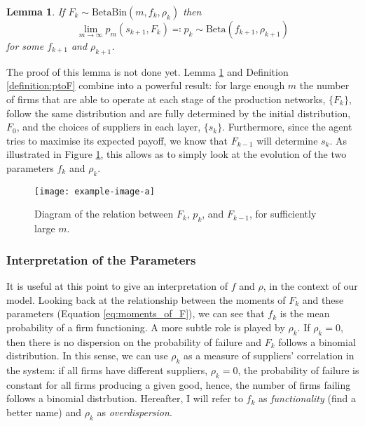 \documentclass[american, abstract=on]{scrartcl}
\newcommand{\inputTikZ}[2]{%
        \scalebox{#1}{}  
      }
\theoremstyle{plain}
\newtheorem{lemma}{Lemma}
\newcommand{\Beta}{\text{Beta}}
\newcommand{\Bin}{\text{Bin}}
\begin{document}
\begin{lemma} \label{lemma:Ftop}
  If $F_k \sim \Beta\Bin(m, f_k, \rho_k)$ then \begin{equation*}\lim_{m \rightarrow \infty} p_m(s_{k + 1}, F_k) \eqqcolon p_k \sim \Beta(f_{k + 1}, \rho_{k + 1})\end{equation*} for some $f_{k + 1}$ and $\rho_{k + 1}$.
\end{lemma}

The proof of this lemma {\color{red} is not done yet.} Lemma \ref*{lemma:Ftop} and Definition \ref*{definition:ptoF} combine into a powerful result: for large enough $m$ the number of firms that are able to operate at each stage of the production networks, $\{F_k\}$, follow the same distribution and are fully determined by the initial distribution, $F_0$, and the choices of suppliers in each layer, $\{s_k\}$. Furthermore, since the agent tries to maximise its expected payoff, we know that $F_{k - 1}$ will determine $s_k$. As illustrated in Figure \ref*{fig:propagation-of-risk}, this allows as to simply look at the evolution of the two parameters $f_k$ and $\rho_k$.


\begin{figure}[H]
  \centering
  \texttt{[image: example-image-a]}
  \caption{Diagram of the relation between $F_k$, $p_k$, and $F_{k - 1}$, for sufficiently large $m$.}
  \label{fig:propagation-of-risk}
\end{figure}

\subsubsection{Interpretation of the Parameters}

It is useful at this point to give an interpretation of $f$ and $\rho$, in the context of our model. Looking back at the relationship between the moments of $F_k$ and these parameters (Equation \ref{eq:moments_of_F}), we can see that $f_k$ is the mean probability of a firm functioning. A more subtle role is played by $\rho_k$. If $\rho_k = 0$, then there is no dispersion on the probability of failure and $F_k$ follows a binomial distribution. In this sense, we can use $\rho_k$ as a measure of suppliers' correlation in the system: if all firms have different suppliers, $\rho_k = 0$, the probability of failure is constant for all firms producing a given good, hence, the number of firms failing follows a binomial distrbution. Hereafter, I will refer to $f_k$ as \textit{functionality} {\color{red} (find a better name)} and $\rho_k$ as \textit{overdispersion}.
\end{document}
